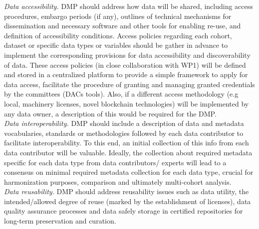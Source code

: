 \documentclass{article}
\begin{document}
\textit{Data accessibility.} DMP should address how data will be shared, including access procedures, embargo periods (if any), outlines of technical mechanisms for dissemination and necessary software and other tools for enabling re-use, and definition of accessibility conditions.
Access policies regarding each cohort, dataset or specific data types or variables should be gather in advance to implement the corresponding provisions for data accessibility and discoverability of data. These access policies (in close collaboration with WP1) will be defined and stored in a centralized platform
to provide a simple framework to apply for data access, facilitate the procedure of granting and managing granted credentials by the committees (DACs tools). Also, if a different access methodology (e.g local, machinery licenses, novel blockchain technologies) will be implemented by any data owner, a description of this would be required for the DMP.\\


\textit{Data interoperability.}
DMP should include a description of data and metadata vocabularies, standards or methodologies followed by each data contributor to facilitate interoperability. To this end, an initial collection of this info from each data contributor will be valuable. Ideally, the collection about required metadata specific for each data type from data contributors/ experts will lead to a consensus on minimal required metadata collection for each data type, crucial for harmonization purposes, comparison and ultimately multi-cohort analysis.\\
 

\textit{Data reusability.}
DMP should address reusability issues such as data utility, the intended/allowed degree of reuse (marked by the establishment of licenses), data quality assurance processes and data safely storage in certified repositories for long-term preservation and curation.\\
 
\end{document}
